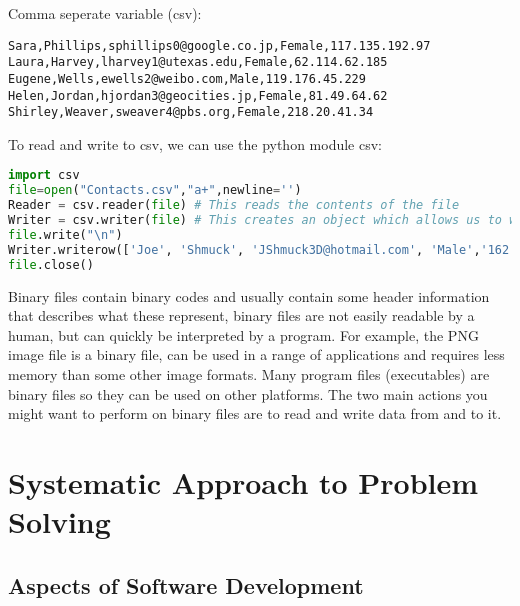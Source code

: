 \documentclass[a4paper]{article}
\begin{document}
			Comma seperate variable (csv):
			\begin{lstlisting}
Sara,Phillips,sphillips0@google.co.jp,Female,117.135.192.97
Laura,Harvey,lharvey1@utexas.edu,Female,62.114.62.185
Eugene,Wells,ewells2@weibo.com,Male,119.176.45.229
Helen,Jordan,hjordan3@geocities.jp,Female,81.49.64.62
Shirley,Weaver,sweaver4@pbs.org,Female,218.20.41.34 	\end{lstlisting}
			To read and write to csv, we can use the python module csv:
			\begin{lstlisting}[language=python]
import csv
file=open("Contacts.csv","a+",newline='')
Reader = csv.reader(file) # This reads the contents of the file
Writer = csv.writer(file) # This creates an object which allows us to write to the file.
file.write("\n")
Writer.writerow(['Joe', 'Shmuck', 'JShmuck3D@hotmail.com', 'Male','162.148.10.205'])
file.close()	\end{lstlisting}
			Binary files contain binary codes and usually contain some header information that describes what these represent, binary files are not easily readable by a human, but can quickly be interpreted by a program. For example, the PNG image file is a binary file, can be used in a range of applications and requires less memory than some other image formats. Many program files (executables) are binary files so they can be used on other platforms. The two main actions you might want to perform on binary files are to read and write data from and to it.
	\section{Systematic Approach to Problem Solving}
		\subsection{Aspects of Software Development}
\end{document}
